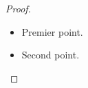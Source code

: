 \begin{proof}
  \begin{itemize}
    \item Premier point.
    \item Second point.
  \end{itemize}
\end{proof} %
